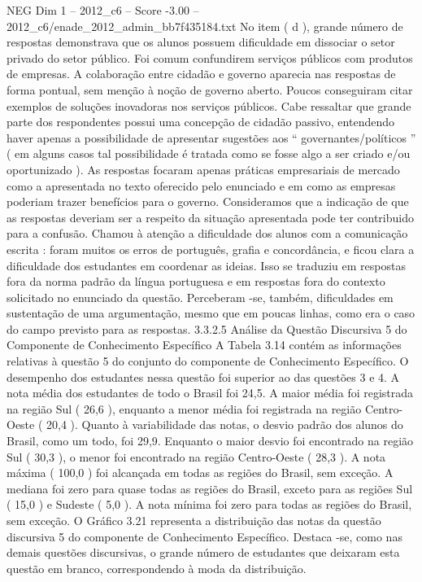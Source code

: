 \begin{textsample}{NEG Dim 1 – 2012\_c6 – Score -3.00 – 2012\_c6/enade\_2012\_admin\_bb7f435184.txt}
No item ( d ), grande número de respostas demonstrava que os alunos possuem dificuldade em dissociar o setor privado do setor público.
Foi comum confundirem serviços públicos com produtos de empresas.
A colaboração entre cidadão e governo aparecia nas respostas de forma pontual, sem menção à noção de governo aberto.
Poucos conseguiram citar exemplos de soluções inovadoras nos serviços públicos.
Cabe ressaltar que grande parte dos respondentes possui uma concepção de cidadão passivo, entendendo haver apenas a possibilidade de apresentar sugestões aos “ governantes/políticos ” ( em alguns casos tal possibilidade é tratada como se fosse algo a ser criado e/ou oportunizado ).
As respostas focaram apenas práticas empresariais de mercado como a apresentada no texto oferecido pelo enunciado e em como as empresas poderiam trazer benefícios para o governo.
Consideramos que a indicação de que as respostas deveriam ser a respeito da situação apresentada pode ter contribuido para a confusão.
Chamou à atenção a dificuldade dos alunos com a comunicação escrita : foram muitos os erros de português, grafia e concordância, e ficou clara a dificuldade dos estudantes em coordenar as ideias.
Isso se traduziu em respostas fora da norma padrão da língua portuguesa e em respostas fora do contexto solicitado no enunciado da questão.
Perceberam -se, também, dificuldades em sustentação de uma argumentação, mesmo que em poucas linhas, como era o caso do campo previsto para as respostas. 3.3.2.5 Análise da Questão Discursiva 5 do Componente de Conhecimento Específico A Tabela 3.14 contém as informações relativas à questão 5 do conjunto do componente de Conhecimento Específico.
O desempenho dos estudantes nessa questão foi superior ao das questões 3 e 4.
A nota média dos estudantes de todo o Brasil foi 24,5.
A maior média foi registrada na região Sul ( 26,6 ), enquanto a menor média foi registrada na região Centro-Oeste ( 20,4 ).
Quanto à variabilidade das notas, o desvio padrão dos alunos do Brasil, como um todo, foi 29,9.
Enquanto o maior desvio foi encontrado na região Sul ( 30,3 ), o menor foi encontrado na região Centro-Oeste ( 28,3 ).
A nota máxima ( 100,0 ) foi alcançada em todas as regiões do Brasil, sem exceção.
A mediana foi zero para quase todas as regiões do Brasil, exceto para as regiões Sul ( 15,0 ) e Sudeste ( 5,0 ).
A nota mínima foi zero para todas as regiões do Brasil, sem exceção.
O Gráfico 3.21 representa a distribuição das notas da questão discursiva 5 do componente de Conhecimento Específico.
Destaca -se, como nas demais questões discursivas, o grande número de estudantes que deixaram esta questão em branco, correspondendo à moda da distribuição.

\end{textsample}
